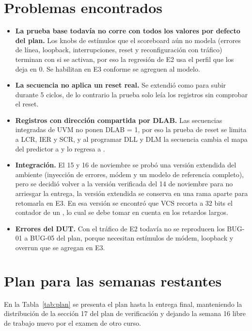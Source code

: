 \documentclass[11pt,a4paper]{article}
\begin{document}
\section{Problemas encontrados}
\begin{itemize}
\item \textbf{La prueba base todavía no corre con todos los valores por defecto del plan.} Los knobs de estímulos que el scoreboard aún no modela (errores de línea, loopback, interrupciones, reset y reconfiguración con tráfico) terminan con  si se activan, por eso la regresión de E2 usa el perfil  que los deja en 0. Se habilitan en E3 conforme se agreguen al modelo.
\item \textbf{La secuencia  no aplica un reset real.} Se extendió como  para subir  durante 5 ciclos, de lo contrario la prueba solo leía los registros sin comprobar el reset.
\item \textbf{Registros con dirección compartida por DLAB.} Las secuencias integradas de UVM no ponen DLAB = 1, por eso la prueba de reset se limita a LCR, IER y SCR, y al programar DLL y DLM la secuencia cambia el mapa del predictor a  y lo regresa a .
\item \textbf{Integración.} El 15 y 16 de noviembre se probó una versión extendida del ambiente (inyección de errores, módem y un modelo de referencia completo), pero se decidió volver a la versión verificada del 14 de noviembre para no arriesgar la entrega, la versión extendida se conserva en una rama aparte para retomarla en E3. En esa versión se encontró que VCS recorta a 32 bits el contador de un , lo cual se debe tomar en cuenta en los retardos largos.
\item \textbf{Errores del DUT.} Con el tráfico de E2 todavía no se reproducen los BUG-01 a BUG-05 del plan, porque necesitan estímulos de módem, loopback y overrun que se agregan en E3.
\end{itemize}

\section{Plan para las semanas restantes}
\label{sec:plan}
En la Tabla~\ref{tab:plan} se presenta el plan hasta la entrega final, manteniendo la distribución de la sección 17 del plan de verificación y dejando la semana 16 libre de trabajo nuevo por el examen de otro curso.
\end{document}
